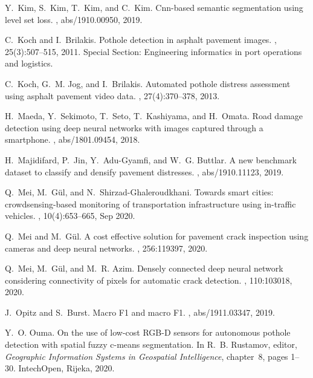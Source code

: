 \documentclass[twocolumn]{article}
\begin{document}
\begin{thebibliography}{10}
Y.~Kim, S.~Kim, T.~Kim, and C.~Kim.
\newblock Cnn-based semantic segmentation using level set loss.
, abs/1910.00950, 2019.

C.~Koch and I.~Brilakis.
\newblock Pothole detection in asphalt pavement images.
, 25(3):507--515, 2011.
\newblock Special Section: Engineering informatics in port operations and
  logistics.

C.~Koch, G.~M. Jog, and I.~Brilakis.
\newblock Automated pothole distress assessment using asphalt pavement video
  data.
, 27(4):370--378,
  2013.

H.~Maeda, Y.~Sekimoto, T.~Seto, T.~Kashiyama, and H.~Omata.
\newblock Road damage detection using deep neural networks with images captured
  through a smartphone.
, abs/1801.09454, 2018.

H.~Majidifard, P.~Jin, Y.~Adu{-}Gyamfi, and W.~G. Buttlar.
 {A} new benchmark dataset to classify and densify pavement
  distresses.
, abs/1910.11123, 2019.

Q.~Mei, M.~G{\"u}l, and N.~Shirzad-Ghaleroudkhani.
\newblock Towards smart cities: crowdsensing-based monitoring of transportation
  infrastructure using in-traffic vehicles.
, 10(4):653--665,
  Sep 2020.

Q.~Mei and M.~Gül.
\newblock A cost effective solution for pavement crack inspection using cameras
  and deep neural networks.
, 256:119397, 2020.

Q.~Mei, M.~Gül, and M.~R. Azim.
\newblock Densely connected deep neural network considering connectivity of
  pixels for automatic crack detection.
, 110:103018, 2020.

J.~Opitz and S.~Burst.
\newblock Macro {F1} and macro {F1}.
, abs/1911.03347, 2019.

Y.~O. Ouma.
\newblock On the use of low-cost {RGB-D} sensors for autonomous pothole
  detection with spatial fuzzy c-means segmentation.
\newblock In R.~B. Rustamov, editor, {\em Geographic Information Systems in
  Geospatial Intelligence}, chapter~8, pages 1--30. IntechOpen, Rijeka, 2020.


\end{thebibliography}
\end{document}
